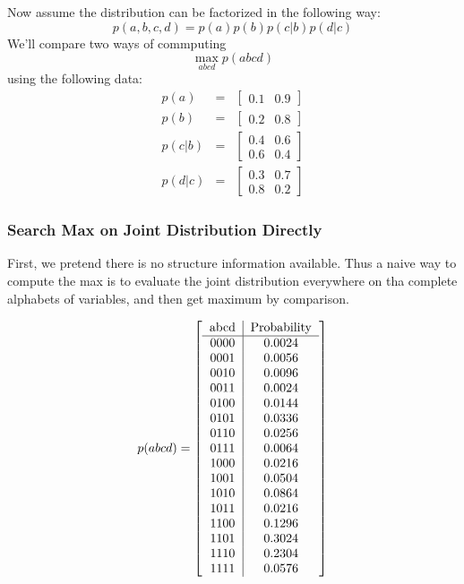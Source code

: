 \documentclass[11pt,a4paper]{article}
\begin{document}
Now assume the distribution can be factorized in the following way:
\begin{equation}
	p(a,b,c,d) = p(a)p(b)p(c|b)p(d|c)
	\label{eq:toy_chain}
\end{equation}
We'll compare two ways of commputing \
$$\max_{abcd}{p(abcd)}$$
 using the following data:
\begin{eqnarray}
	p(a) &=& \left[
	\begin{matrix}
	0.1 & 0.9
	\end{matrix}
	\right] \\
	p(b) &=& \left[
	\begin{matrix}
	0.2 & 0.8
	\end{matrix}
	\right] \\
	p(c|b) &=& \left[
	\begin{matrix}
	0.4 & 0.6 \\
	0.6 & 0.4
	\end{matrix}
	\right] \\
	p(d|c) &=& \left[
	\begin{matrix}
	0.3 & 0.7 \\
	0.8 & 0.2
	\end{matrix}
	\right] 
\end{eqnarray}

\subsubsection{Search Max on Joint Distribution Directly}
First, we pretend there is no structure information available. 
Thus a naive way to compute the max is to evaluate the joint distribution 
everywhere on tha complete alphabets of variables, and then get 
maximum by comparison. 

\begin{equation}
p(abcd)=\left[ 
\begin{tabular}{c|c}
abcd & Probability \\
\hline
  0000 & 0.0024 \\
  0001 & 0.0056 \\ 
  0010 & 0.0096 \\ 
  0011 & 0.0024 \\ 
  0100 & 0.0144 \\ 
  0101 & 0.0336 \\ 
  0110 & 0.0256 \\ 
  0111 & 0.0064 \\ 
  1000 & 0.0216 \\ 
  1001 & 0.0504 \\ 
  1010 & 0.0864 \\ 
  1011 & 0.0216 \\ 
  1100 & 0.1296 \\ 
  1101 & 0.3024 \\ 
  1110 & 0.2304 \\ 
  1111 & 0.0576 \\ 
\end{tabular} \right]
\end{equation}
\end{document}
